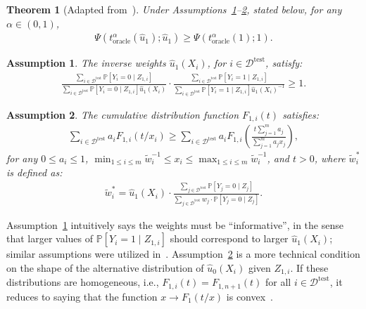 \documentclass[11pt]{article}
\newtheorem{theorem}{Theorem}
\newtheorem{assumption}{Assumption}
\renewcommand{\P}[1]{\mathbb{P}\left[#1\right]}
\begin{document}
\begin{theorem}[Adapted from~\cite{liang2022locally}] \label{theorem:power}
Under Assumptions~\ref{assumption:informative-weights}--\ref{assumption:cdf}, stated below, for any $\alpha \in (0,1)$,
\begin{align}
  \Psi(t^{\alpha}_{\mathrm{oracle}}(\hat{u}_1); \hat{u}_1) \geq \Psi(t^{\alpha}_{\mathrm{oracle}}(1); 1).
\end{align}
\end{theorem}

\begin{assumption} \label{assumption:informative-weights}
The inverse weights $\hat{u}_1(X_{i})$, for $i \in \mathcal{D}^{\mathrm{test}}$, satisfy:
\begin{align} \label{eq:informative-weights}
  \frac{\sum_{i \in \mathcal{D}^{\mathrm{test}}}{\P{ Y_i = 0 \mid Z_{1,i}} }}{\sum_{i \in \mathcal{D}^{\mathrm{test}}}\P{ Y_i = 0 \mid Z_{1,i}} \hat{u}_1(X_{i})} \cdot
  \frac{\sum_{i \in \mathcal{D}^{\mathrm{test}}}{\P{ Y_i = 1 \mid Z_{1,i}}}}{\sum_{i \in \mathcal{D}^{\mathrm{test}}}\P{Y_i = 1 \mid Z_{1,i}} \hat{u}_1(X_{i})^{-1}}
  \geq 1.
\end{align}
\end{assumption}

\begin{assumption} \label{assumption:cdf}
The cumulative distribution function $F_{1,i}(t)$ satisfies:
\begin{align*}
  \sum_{i \in \mathcal{D}^{\mathrm{test}}} a_i F_{1,i}(t/x_i)
  \geq
  \sum_{i \in \mathcal{D}^{\mathrm{test}}} a_i F_{1,i}\left( \frac{t \sum_{j=1}^m a_j}{\sum_{j=1}^m a_jx_j} \right),
\end{align*}
for any $0 \leq a_i\leq 1$, $\min_{1 \leq i \leq m} \tilde{w}_i^{-1} \leq x_i \leq \max_{1 \leq i \leq m} \tilde{w}_i^{-1}$, and $t > 0$, where $\tilde{w}^*_i$ is defined as:
\begin{align} \label{eq:power-tilde-w}
  \tilde{w}^*_i = \hat{u}_1(X_i) \cdot \frac{\sum_{j \in \mathcal{D}^{\mathrm{test}}} \P{ Y_j = 0 \mid Z_j} }{ \sum_{j \in \mathcal{D}^{\mathrm{test}}} w_j \cdot \P{Y_j = 0 \mid Z_j} }.
\end{align}

\end{assumption}

Assumption~\ref{assumption:informative-weights} intuitively says the weights must be ``informative'', in the sense that larger values of $\P{Y_i = 1 \mid Z_{1,i}}$ should correspond to larger $\hat{u}_1(X_{i})$; similar assumptions were utilized in~\cite{Genetal06,liang2022locally}.
Assumption~\ref{assumption:cdf} is a more technical condition on the shape of the alternative distribution of $\hat{u}_0(X_i)$ given $Z_{1,i}$.
If these distributions are homogeneous, i.e., $F_{1,i}(t) = F_{1,n+1}(t)$ for all $i \in \mathcal{D}^{\mathrm{test}}$, it reduces to saying that the function $x \rightarrow F_{1}(t/x)$ is convex~\cite{liang2022locally}.
\end{document}
